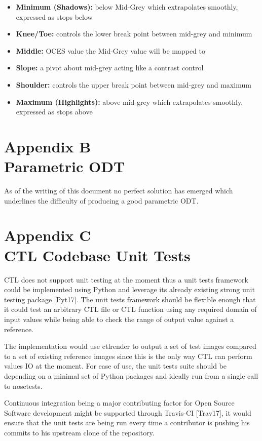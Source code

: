 \documentclass[conference]{IEEEtran}
\begin{document}
\begin{itemize}
\item \textbf{Minimum (Shadows):} below Mid-Grey which extrapolates smoothly, expressed as stops below
\item \textbf{Knee/Toe:} controls the lower break point between mid-grey and minimum
\item \textbf{Middle:} OCES value the Mid-Grey value will be mapped to
\item \textbf{Slope:} a pivot about mid-grey acting like a contrast control
\item \textbf{Shoulder:} controls the upper break point between mid-grey and maximum
\item \textbf{Maximum (Highlights):} above mid-grey which extrapolates smoothly, expressed as stops above
\end{itemize}

\newpage

\section*{Appendix B\\ \small Parametric ODT}
As of the writing of this document no perfect solution has emerged which underlines the difficulty of producing a good parametric ODT.

\section*{Appendix C\\ \small CTL Codebase Unit Tests}
CTL does not support unit testing at the moment thus a unit tests framework could be implemented using Python and leverage its already existing strong unit testing package [Pyt17]. The unit tests framework should be flexible enough that it could test an arbitrary CTL file or CTL function using any required domain of input values while being able to check the range of output value against a reference.

The implementation would use ctlrender to output a set of test images compared to a set of existing reference images since this is the only way CTL can perform values IO at the moment. For ease of use, the unit tests suite should be depending on a minimal set of Python packages and ideally run from a single call to nosetests.

Continuous integration being a major contributing factor for Open Source Software development might be supported through Travis-CI [Trav17], it would ensure that the unit tests are being run every time a contributor is pushing his commits to his upstream clone of the repository.
\end{document}
